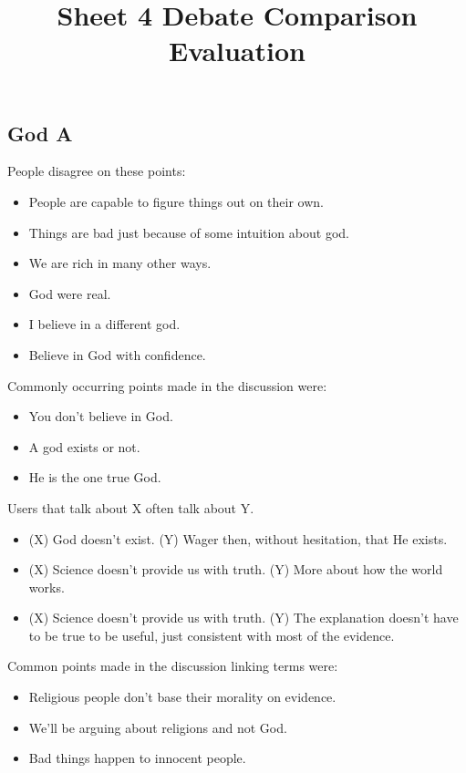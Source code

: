 \documentclass[tikz]{article}
\title{\textbf{Sheet 4} Debate Comparison Evaluation\vspace{-9ex}}
\date{}
\begin{document}
  \maketitle

  \begin{multicols}{2}
    \subsection*{God A}
    People disagree on these points:
    \begin{itemize}[noitemsep,nolistsep,label={}]
		\item{People are capable to figure things out on their own.}
		\item{Things are bad just because of some intuition about god.}
		\item{We are rich in many other ways.}
		\item{God were real.}
		\item{I believe in a different god.}
		\item{Believe in God with confidence.}
    \end{itemize}

    Commonly occurring points made in the discussion were:
    \begin{itemize}[noitemsep,nolistsep,label={}]
		\item{You don't believe in God.}
		\item{A god exists or not.}
		\item{He is the one true God.}
    \end{itemize}

    Users that talk about X often talk about Y.
    \begin{itemize}[noitemsep,nolistsep,label={}]
		\item{(X) God doesn't exist. (Y) Wager then, without hesitation, that He exists.}
		\item{(X) Science doesn't provide us with truth. (Y) More about how the world works.}
		\item{(X) Science doesn't provide us with truth. (Y) The explanation doesn't have to be true to be useful, just consistent with most of the evidence.}
    \end{itemize}

    Common points made in the discussion linking terms were:
    \begin{itemize}[noitemsep,nolistsep,label={}]
		\item{Religious people don't base their morality on evidence.}
		\item{We'll be arguing about religions and not God.}
		\item{Bad things happen to innocent people.}
    \end{itemize}


\end{multicols}
\end{document}
